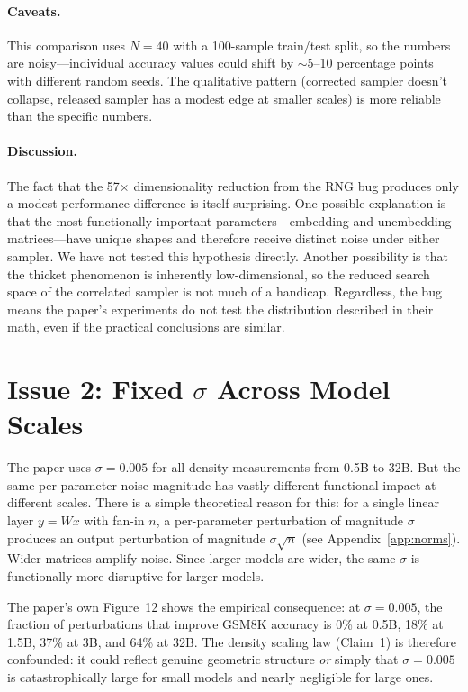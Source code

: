 \documentclass[11pt]{article}
\begin{document}
\paragraph{Caveats.} This comparison uses $N=40$ with a 100-sample train/test split, so the numbers are noisy---individual accuracy values could shift by $\sim$5--10 percentage points with different random seeds. The qualitative pattern (corrected sampler doesn't collapse, released sampler has a modest edge at smaller scales) is more reliable than the specific numbers.

\paragraph{Discussion.} The fact that the 57$\times$ dimensionality reduction from the RNG bug produces only a modest performance difference is itself surprising. One possible explanation is that the most functionally important parameters---embedding and unembedding matrices---have unique shapes and therefore receive distinct noise under either sampler. We have not tested this hypothesis directly. Another possibility is that the thicket phenomenon is inherently low-dimensional, so the reduced search space of the correlated sampler is not much of a handicap. Regardless, the bug means the paper's experiments do not test the distribution described in their math, even if the practical conclusions are similar.


\section{Issue 2: Fixed $\sigma$ Across Model Scales}\label{sec:sigma}

The paper uses $\sigma=0.005$ for all density measurements from 0.5B to 32B. But the same per-parameter noise magnitude has vastly different functional impact at different scales. There is a simple theoretical reason for this: for a single linear layer $y = Wx$ with fan-in $n$, a per-parameter perturbation of magnitude $\sigma$ produces an output perturbation of magnitude $\sigma\sqrt{n}$ (see Appendix~\ref{app:norms}). Wider matrices amplify noise. Since larger models are wider, the same $\sigma$ is functionally more disruptive for larger models.

The paper's own Figure~12 shows the empirical consequence: at $\sigma=0.005$, the fraction of perturbations that improve GSM8K accuracy is 0\% at 0.5B, 18\% at 1.5B, 37\% at 3B, and 64\% at 32B. The density scaling law (Claim~1) is therefore confounded: it could reflect genuine geometric structure \emph{or} simply that $\sigma=0.005$ is catastrophically large for small models and nearly negligible for large ones.
\end{document}
